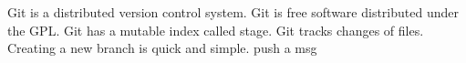Git is a distributed version control system.
Git is free software distributed under the GPL.
Git has a mutable index called stage.
Git tracks changes of files.
Creating a new branch is quick and simple.
push a msg
